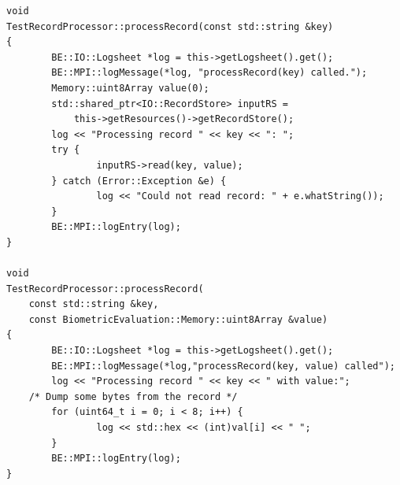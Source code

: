 \begin{lstlisting}[caption={MPI Framework Application Implementation}, label=lst:mpiappimpl]
void
TestRecordProcessor::processRecord(const std::string &key)
{
        BE::IO::Logsheet *log = this->getLogsheet().get();
        BE::MPI::logMessage(*log, "processRecord(key) called.");
        Memory::uint8Array value(0);
        std::shared_ptr<IO::RecordStore> inputRS =
            this->getResources()->getRecordStore();
        log << "Processing record " << key << ": ";
        try {
                inputRS->read(key, value);
        } catch (Error::Exception &e) {
                log << "Could not read record: " + e.whatString());
        }
       	BE::MPI::logEntry(log);
}

void
TestRecordProcessor::processRecord(
    const std::string &key,
    const BiometricEvaluation::Memory::uint8Array &value)
{
        BE::IO::Logsheet *log = this->getLogsheet().get();
        BE::MPI::logMessage(*log,"processRecord(key, value) called");
        log << "Processing record " << key << " with value:";
	/* Dump some bytes from the record */
        for (uint64_t i = 0; i < 8; i++) {
                log << std::hex << (int)val[i] << " ";
        }
        BE::MPI::logEntry(log);
}

\end{lstlisting}

